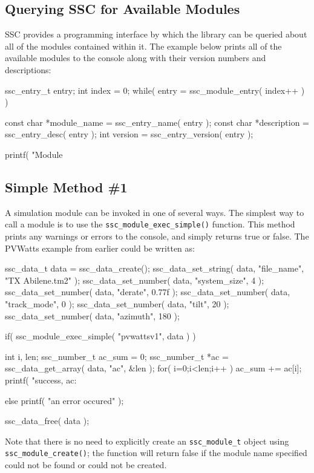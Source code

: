 \documentclass{article}
\begin{document}
\subsection{Querying SSC for Available Modules}
\label{sec_modules_querying}

SSC provides a programming interface by which the library can be queried about all of the modules contained within it.  The example below prints all of the available modules to the console along with their version numbers and descriptions:

\begin{verbatimtab}[4]
ssc_entry_t entry;
int index = 0;
while( entry = ssc_module_entry( index++ ) )
{
	const char *module_name = ssc_entry_name( entry );
	const char *description = ssc_entry_desc( entry );
	int version = ssc_entry_version( entry );

	printf( "Module %
}
\end{verbatimtab}

\subsection{Simple Method \#1}

A simulation module can be invoked in one of several ways.  The simplest way to call a module is to use the \texttt{ssc\_module\_exec\_simple()} function.  This method prints any warnings or errors to the console, and simply returns true or false. The PVWatts example from earlier could be written as:

\begin{verbatimtab}[4]
ssc_data_t data = ssc_data_create();
ssc_data_set_string( data, "file_name", "TX Abilene.tm2" );
ssc_data_set_number( data, "system_size", 4 );
ssc_data_set_number( data, "derate", 0.77f );
ssc_data_set_number( data, "track_mode", 0 );
ssc_data_set_number( data, "tilt", 20 );
ssc_data_set_number( data, "azimuth", 180 );

if( ssc_module_exec_simple( "pvwattsv1", data ) )
{
	int i, len;
	ssc_number_t ac_sum = 0;
	ssc_number_t *ac = ssc_data_get_array( data, "ac", &len );
	for( i=0;i<len;i++ ) ac_sum += ac[i];
	printf( "success, ac: %

}
else
	printf( "an error occured\n" );

ssc_data_free( data );
\end{verbatimtab}

Note that there is no need to explicitly create an \texttt{ssc\_module\_t} object using \texttt{ssc\_module\_create()}; the function will return false if the module name specified could not be found or could not be created.
\end{document}
